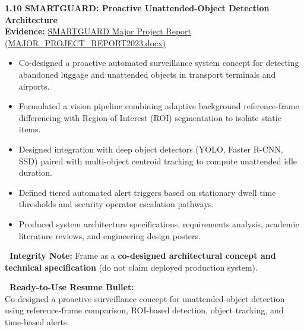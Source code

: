 \documentclass[10pt,a4paper]{article}
\newcommand{\statusconcept}{\tcbox[on line, colback=conceptbg, colframe=concept!50!white, size=small, arc=2pt, boxrule=0.5pt]{\scriptsize\bfseries\color{concept}\faIcon{lightbulb}\ CONCEPT / RESEARCH ONLY}}
\begin{document}
\begin{projectcard}
  \textbf{\large 1.10 SMARTGUARD: Proactive Unattended-Object Detection Architecture} \hfill \statusconcept\\[2pt]
  {\footnotesize\color{textmuted}\textbf{Evidence:} \underline{SMARTGUARD Major Project Report (MAJOR\_PROJECT\_REPORT2023.docx)}}
  \begin{itemize}[leftmargin=14pt, itemsep=1.5pt, topsep=2pt]
    \item Co-designed a proactive automated surveillance system concept for detecting abandoned luggage and unattended objects in transport terminals and airports.
    \item Formulated a vision pipeline combining adaptive background reference-frame differencing with Region-of-Interest (ROI) segmentation to isolate static items.
    \item Designed integration with deep object detectors (YOLO, Faster R-CNN, SSD) paired with multi-object centroid tracking to compute unattended idle duration.
    \item Defined tiered automated alert triggers based on stationary dwell time thresholds and security operator escalation pathways.
    \item Produced system architecture specifications, requirements analysis, academic literature reviews, and engineering design posters.
  \end{itemize}
  \begin{metricsbox}[colback=prototypebg!35!white, colframe=prototype!50!white, fontupper=\footnotesize\color{prototype!90!black}]
    \textbf{\ Integrity Note:} Frame as a \textbf{co-designed architectural concept and technical specification} (do not claim deployed production system).
  \end{metricsbox}
  \begin{resumebox}
    \textbf{\color{accent}\ Ready-to-Use Resume Bullet:}\\
    Co-designed a proactive surveillance concept for unattended-object detection using reference-frame comparison, ROI-based detection, object tracking, and time-based alerts.
  \end{resumebox}
\end{projectcard}

\newpage
\end{document}
